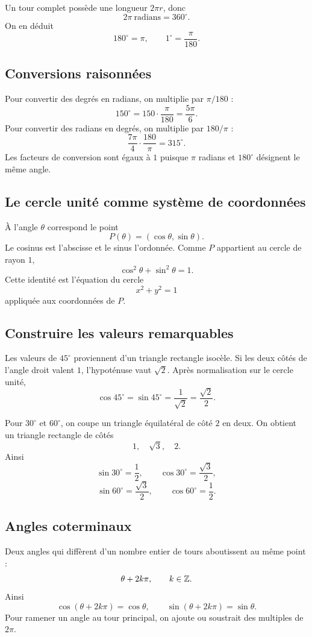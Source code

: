 Un tour complet possède une longueur $2\pi r$, donc
\[
2\pi\ \text{radians}=360^\circ.
\]
On en déduit
\[
180^\circ=\pi,
\qquad
1^\circ=\frac\pi{180}.
\]

\subsection{Conversions raisonnées}

Pour convertir des degrés en radians, on multiplie par $\pi/180$ :
\[
150^\circ=150\cdot\frac\pi{180}=\frac{5\pi}{6}.
\]
Pour convertir des radians en degrés, on multiplie par $180/\pi$ :
\[
\frac{7\pi}{4}\cdot\frac{180}{\pi}=315^\circ.
\]
Les facteurs de conversion sont égaux à $1$ puisque $\pi$ radians et $180^\circ$ désignent le même angle.

\subsection{Le cercle unité comme système de coordonnées}

À l'angle $\theta$ correspond le point
\[
P(\theta)=(\cos\theta,\sin\theta).
\]
Le cosinus est l'abscisse et le sinus l'ordonnée. Comme $P$ appartient au cercle de rayon $1$,
\[
\cos^2\theta+\sin^2\theta=1.
\]
Cette identité est l'équation du cercle
\[
x^2+y^2=1
\]
appliquée aux coordonnées de $P$.

\subsection{Construire les valeurs remarquables}

Les valeurs de $45^\circ$ proviennent d'un triangle rectangle isocèle. Si les deux côtés de l'angle droit valent $1$, l'hypoténuse vaut $\sqrt2$. Après normalisation sur le cercle unité,
\[
\cos45^\circ=\sin45^\circ=\frac1{\sqrt2}=\frac{\sqrt2}{2}.
\]

Pour $30^\circ$ et $60^\circ$, on coupe un triangle équilatéral de côté $2$ en deux. On obtient un triangle rectangle de côtés
\[
1,\quad\sqrt3,\quad2.
\]
Ainsi
\[
\sin30^\circ=\frac12,
\qquad
\cos30^\circ=\frac{\sqrt3}{2},
\]
\[
\sin60^\circ=\frac{\sqrt3}{2},
\qquad
\cos60^\circ=\frac12.
\]

\subsection{Angles coterminaux}

Deux angles qui diffèrent d'un nombre entier de tours aboutissent au même point :
\[
\theta+2k\pi,
\qquad k\in\mathbb{Z}.
\]
Ainsi
\[
\cos(\theta+2k\pi)=\cos\theta,
\qquad
\sin(\theta+2k\pi)=\sin\theta.
\]
Pour ramener un angle au tour principal, on ajoute ou soustrait des multiples de $2\pi$.

